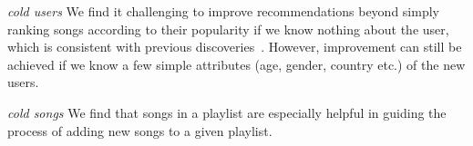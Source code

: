 \emph{cold users}
We find it challenging to improve recommendations beyond simply ranking songs according to their popularity 
if we know nothing about the user, which is consistent with previous 
discoveries~\cite{mcfee2012million,bonnin2013evaluating,bonnin2015automated}.
However, improvement can still be achieved if we know a few simple attributes (\eg age, gender, country etc.)
of the new users.

\emph{cold songs}
We find that songs in a playlist are especially helpful in guiding the process of adding new songs to a given playlist.




